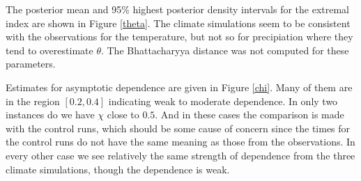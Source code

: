 The posterior mean and 95\% highest posterior density intervals for the extremal index are shown in Figure \ref{theta}. The climate simulations seem to be consistent with the observations for the temperature, but not so for precipiation where they tend to overestimate $\theta$. The Bhattacharyya distance was not computed for these parameters.

Estimates for asymptotic dependence are given in Figure \ref{chi}. Many of them are in the region $[0.2, 0.4]$ indicating weak to moderate dependence. In only two instances do we have $\chi$ close to $0.5$. And in these cases the comparison is made with the control runs, which should be some cause of concern since the times for the control runs do not have the same meaning as those from the observations. In every other case we see relatively the same strength of dependence from the three climate simulations, though the dependence is weak.
